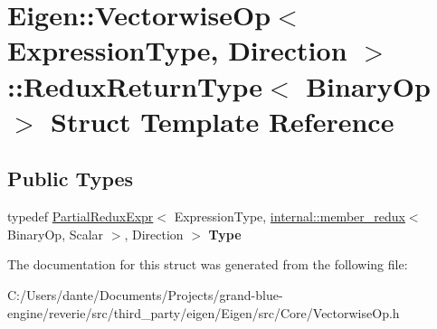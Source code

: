 \hypertarget{struct_eigen_1_1_vectorwise_op_1_1_redux_return_type}{}\section{Eigen\+::Vectorwise\+Op$<$ Expression\+Type, Direction $>$\+::Redux\+Return\+Type$<$ Binary\+Op $>$ Struct Template Reference}
\label{struct_eigen_1_1_vectorwise_op_1_1_redux_return_type}
\subsection*{Public Types}
\begin{DoxyCompactItemize}
\item 
\mbox{\label{struct_eigen_1_1_vectorwise_op_1_1_redux_return_type_a39c1f3a1be03b63e1a87c4da765c3b66}} 
typedef \mbox{\hyperlink{class_eigen_1_1_partial_redux_expr}{Partial\+Redux\+Expr}}$<$ Expression\+Type, \mbox{\hyperlink{struct_eigen_1_1internal_1_1member__redux}{internal\+::member\+\_\+redux}}$<$ Binary\+Op, Scalar $>$, Direction $>$ {\bfseries Type}
\end{DoxyCompactItemize}


The documentation for this struct was generated from the following file\+:\begin{DoxyCompactItemize}
\item 
C\+:/\+Users/dante/\+Documents/\+Projects/grand-\/blue-\/engine/reverie/src/third\+\_\+party/eigen/\+Eigen/src/\+Core/Vectorwise\+Op.\+h\end{DoxyCompactItemize}
